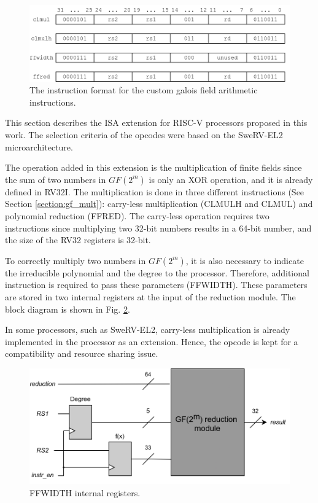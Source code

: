 \begin{figure}[tp]
    \centering
    \includegraphics[width=0.8\linewidth]{img/instr.png}
    \caption{The instruction format for the custom galois field arithmetic instructions.}
    \label{fig:instr}
\end{figure}

This section describes the ISA extension for RISC-V processors proposed in this work. The selection criteria
of the opcodes were based on the SweRV-EL2 \cite{marena2019risc} microarchitecture. 

The operation added in this extension is the multiplication of finite fields since the sum of two numbers in 
$GF(2^m)$ is only an XOR operation, and it is already defined in RV32I. The multiplication is done in three different 
instructions (See Section \ref{section:gf_mult}): carry-less multiplication (CLMULH and CLMUL) and polynomial reduction (FFRED). 
The carry-less operation requires two instructions since multiplying two 32-bit numbers results in a 64-bit number, 
and the size of the RV32 registers is 32-bit.

To correctly multiply two numbers in $GF(2^m)$, it is also necessary to indicate the irreducible polynomial and the 
degree to the processor. Therefore, additional instruction is required to pass these parameters (FFWIDTH). 
These parameters are stored in two internal registers at the input of the reduction module. The block diagram is shown in Fig. \ref{fig:exu}.

In some processors, such as SweRV-EL2, carry-less multiplication is already implemented in the processor as an extension. Hence, 
the opcode is kept for a compatibility and resource sharing issue.

\begin{figure}[b]
    \centering
    \includegraphics[width=0.95\linewidth]{img/exu.png}
    \caption{FFWIDTH internal registers.}
    \label{fig:exu}
\end{figure}


